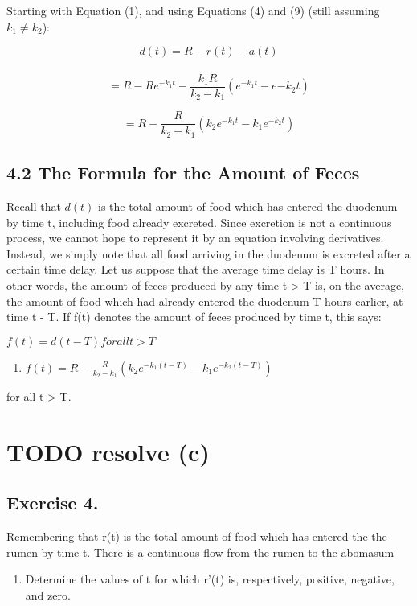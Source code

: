 \documentclass[]{article}
\providecommand{\tightlist}{%
  \setlength{\itemsep}{0pt}\setlength{\parskip}{0pt}}
\begin{document}
Starting with Equation (1), and using Equations (4) and (9) (still
assuming \(k_1 \neq k_2\)):

\[d(t) = R - r(t) - a(t)\]\\
\[= R - Re^{-k_1t} - \frac{k_1R}{k_2 - k_1} (e^{-k_1t}-e{-k_2t})\]

\[= R - \frac{R}{k_2-k_1}(k_2e^{-k_1t} - k_1e^{-k_2t})\]

\subsection{4.2 The Formula for the Amount of
Feces}\label{the-formula-for-the-amount-of-feces}

Recall that \(d(t)\) is the total amount of food which has entered the
duodenum by time t, including food already excreted. Since excretion is
not a continuous process, we cannot hope to represent it by an equation
involving derivatives. Instead, we simply note that all food arriving in
the duodenum is excreted after a certain time delay. Let us suppose that
the average time delay is T hours. In other words, the amount of feces
produced by any time t \textgreater{} T is, on the average, the amount
of food which had already entered the duodenum T hours earlier, at time
t - T. If f(t) denotes the amount of feces produced by time t, this
says:

\(f(t) = d(t-T) for all t > T\)

\begin{enumerate}
\def\labelenumi{(\arabic{enumi})}
\setcounter{enumi}{9}
\tightlist
\item
  \(f(t) = R - \frac{R}{k_2-k_1}(k_2e^{-k_1(t-T)}-k_1e^{-k_2(t-T)})\)
\end{enumerate}

for all t \textgreater{} T.

\section{TODO resolve (c)}\label{todo-resolve-c}

\subsection{Exercise 4.}\label{exercise-4.}

Remembering that r(t) is the total amount of food which has entered the
the rumen by time t. There is a continuous flow from the rumen to the
abomasum

\begin{enumerate}
\def\labelenumi{(\alph{enumi})}
\tightlist
\item
  Determine the values of t for which r'(t) is, respectively, positive,
  negative, and zero.
\end{enumerate}
\end{document}
